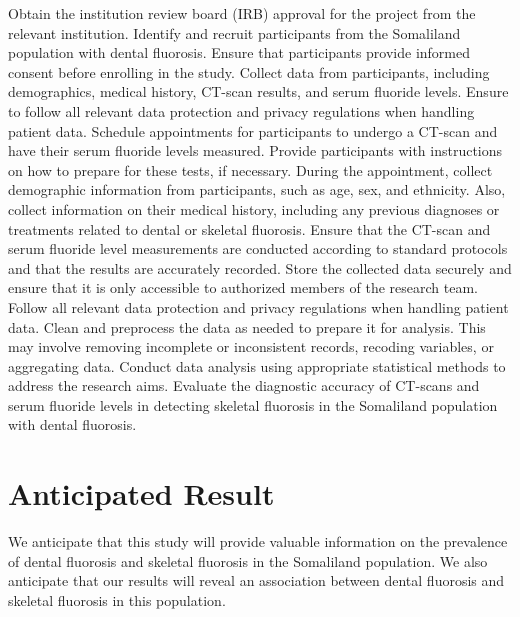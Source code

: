 \documentclass{article}
\begin{document}
\begin{outline}

\1 Obtain the institution review board (IRB) approval for the project from the relevant institution. 
\1 Identify and recruit participants from the Somaliland population with dental fluorosis. Ensure that participants provide informed consent before enrolling in the study. 
\1 Collect data from participants, including demographics, medical history, CT-scan results, and serum fluoride levels. Ensure to follow all relevant data protection and privacy regulations when handling patient data. 
    \2 Schedule appointments for participants to undergo a CT-scan and have their serum fluoride levels measured. Provide participants with instructions on how to prepare for these tests, if necessary. 
    \2 During the appointment, collect demographic information from participants, such as age, sex, and ethnicity. Also, collect information on their medical history, including any previous diagnoses or treatments related to dental or skeletal fluorosis. 
    \2 Ensure that the CT-scan and serum fluoride level measurements are conducted according to standard protocols and that the results are accurately recorded. 
\1 Store the collected data securely and ensure that it is only accessible to authorized members of the research team. Follow all relevant data protection and privacy regulations when handling patient data.
\1 Clean and preprocess the data as needed to prepare it for analysis. This may involve removing incomplete or inconsistent records, recoding variables, or aggregating data. 
\1 Conduct data analysis using appropriate statistical methods to address the research aims. Evaluate the diagnostic accuracy of CT-scans and serum fluoride levels in detecting skeletal fluorosis in the Somaliland population with dental fluorosis.

\end{outline}


\section{Anticipated Result}
We anticipate that this study will provide valuable information on the prevalence of dental fluorosis and skeletal fluorosis in the Somaliland population. We also anticipate that our results will reveal an association between dental fluorosis and skeletal fluorosis in this population.
\end{document}
